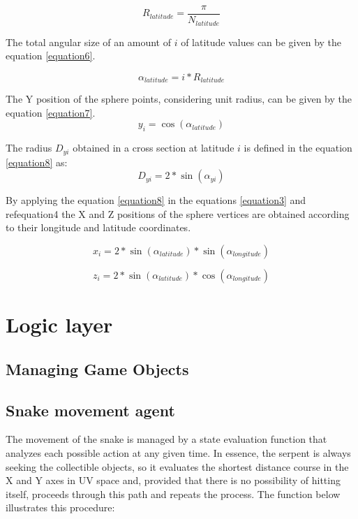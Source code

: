 \documentclass[runningheads]{llncs}
\begin{document}
\begin{equation}
R_{latitude} = \frac{\pi}{ N_{latitude}}
\label{equation5}
\end{equation}

The total angular size of an amount of $i$ of latitude values can be given by the equation \ref{equation6}.

\begin{equation}
\alpha_{latitude} = i * R_{latitude}
\label{equation6}
\end{equation}

The Y position of the sphere points, considering unit radius, can be given by the equation \ref{equation7}.
\begin{equation}
y_{i} = \cos(\alpha_{latitude})
\label{equation7}
\end{equation}

The radius $D_{yi}$ obtained in a cross section at latitude $i$ is defined in the equation \ref{equation8} as:
\begin{equation}
D_{yi} = 2 * \sin(\alpha_{yi})
\label{equation8}
\end{equation}

By applying the equation \ref{equation8} in the equations \ref{equation3} and ref{equation4} the X and Z positions of the sphere vertices are obtained according to their longitude and latitude coordinates.

\begin{equation}
x_{i} = 2 * \sin(\alpha_{latitude}) * \sin(\alpha_{longitude})
\label{equation9}
\end{equation}

\begin{equation}
z_{i} = 2 * \sin(\alpha_{latitude}) * \cos(\alpha_{longitude})
\label{equation10}
\end{equation}

\section{Logic layer}

\subsection{Managing Game Objects}

\subsection{Snake movement agent} \label{sec:agent}
The movement of the snake is managed by a state evaluation function that analyzes each possible action at any given time. In essence, the serpent is always seeking  the collectible objects, so it evaluates the shortest distance course in the X and Y axes in UV space and, provided that there is no possibility of hitting itself, proceeds through this path and repeats the process. The function below illustrates this procedure:
\end{document}
